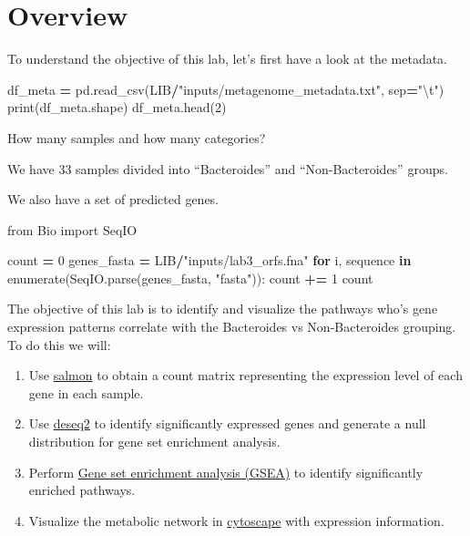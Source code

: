 \documentclass[
]{book}
\newenvironment{Shaded}{\begin{snugshade}}{\end{snugshade}}
\newcommand{\BuiltInTok}[1]{#1}
\newcommand{\CharTok}[1]{\textcolor[rgb]{0.31,0.60,0.02}{#1}}
\newcommand{\ControlFlowTok}[1]{\textcolor[rgb]{0.13,0.29,0.53}{\textbf{#1}}}
\newcommand{\DecValTok}[1]{\textcolor[rgb]{0.00,0.00,0.81}{#1}}
\newcommand{\ImportTok}[1]{#1}
\newcommand{\KeywordTok}[1]{\textcolor[rgb]{0.13,0.29,0.53}{\textbf{#1}}}
\newcommand{\NormalTok}[1]{#1}
\newcommand{\OperatorTok}[1]{\textcolor[rgb]{0.81,0.36,0.00}{\textbf{#1}}}
\newcommand{\StringTok}[1]{\textcolor[rgb]{0.31,0.60,0.02}{#1}}
\providecommand{\tightlist}{%
  \setlength{\itemsep}{0pt}\setlength{\parskip}{0pt}}
\begin{document}
\section{Overview}\label{overview-2}

To understand the objective of this lab, let's first have a look at the metadata.

\begin{Shaded}
\begin{Highlighting}[numbers=left,,]
\NormalTok{df\_meta }\OperatorTok{=}\NormalTok{ pd.read\_csv(LIB}\OperatorTok{/}\StringTok{"inputs/metagenome\_metadata.txt"}\NormalTok{, sep}\OperatorTok{=}\StringTok{"}\CharTok{\textbackslash{}t}\StringTok{"}\NormalTok{)}
\BuiltInTok{print}\NormalTok{(df\_meta.shape)}
\NormalTok{df\_meta.head(}\DecValTok{2}\NormalTok{)}
\end{Highlighting}
\end{Shaded}

How many samples and how many categories?

We have 33 samples divided into ``Bacteroides'' and ``Non-Bacteroides'' groups.

We also have a set of predicted genes.

\begin{Shaded}
\begin{Highlighting}[numbers=left,,]
\ImportTok{from}\NormalTok{ Bio }\ImportTok{import}\NormalTok{ SeqIO}

\NormalTok{count }\OperatorTok{=} \DecValTok{0}
\NormalTok{genes\_fasta }\OperatorTok{=}\NormalTok{ LIB}\OperatorTok{/}\StringTok{"inputs/lab3\_orfs.fna"}
\ControlFlowTok{for}\NormalTok{ i, sequence }\KeywordTok{in} \BuiltInTok{enumerate}\NormalTok{(SeqIO.parse(genes\_fasta, }\StringTok{"fasta"}\NormalTok{)):}
\NormalTok{    count }\OperatorTok{+=} \DecValTok{1}
\NormalTok{count}
\end{Highlighting}
\end{Shaded}

The objective of this lab is to identify and visualize the pathways who's gene expression patterns correlate with the Bacteroides vs Non-Bacteroides grouping.
To do this we will:

\begin{enumerate}
\def\labelenumi{\arabic{enumi}.}
\tightlist
\item
  Use \href{Salmon}{salmon} to obtain a count matrix representing the expression level of each gene in each sample.
\item
  Use \href{DESeq2}{deseq2} to identify significantly expressed genes and generate a null distribution for gene set enrichment analysis.
\item
  Perform \href{gene-set-enrichment-analysis-gsea}{Gene set enrichment analysis (GSEA)} to identify significantly enriched pathways.
\item
  Visualize the metabolic network in \href{Cytoscape}{cytoscape} with expression information.
\end{enumerate}
\end{document}
